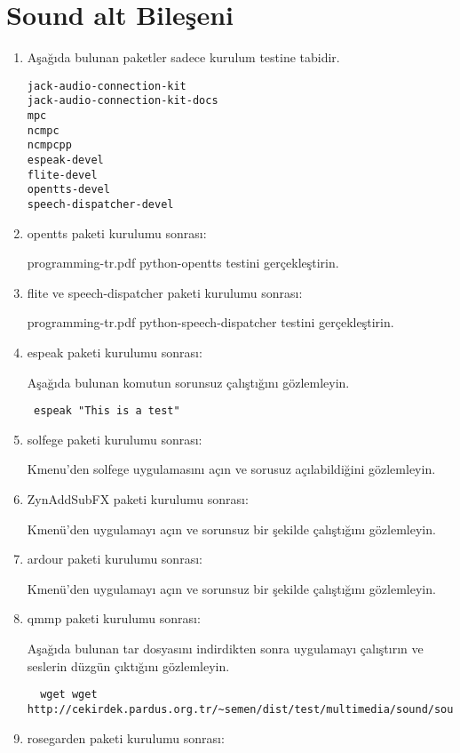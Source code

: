 \documentclass[a4paper,10pt]{article}
\begin{document}
\section{Sound alt Bileşeni}
\begin{enumerate}

\item Aşağıda bulunan paketler sadece kurulum testine tabidir.
\begin{verbatim}
jack-audio-connection-kit 
jack-audio-connection-kit-docs
mpc
ncmpc
ncmpcpp
espeak-devel
flite-devel
opentts-devel
speech-dispatcher-devel
\end{verbatim}
\item opentts paketi kurulumu sonrası:

programming-tr.pdf python-opentts testini gerçekleştirin.


\item flite ve speech-dispatcher paketi kurulumu sonrası:

programming-tr.pdf python-speech-dispatcher testini gerçekleştirin.

\item espeak paketi kurulumu sonrası:

Aşağıda bulunan komutun sorunsuz çalıştığını gözlemleyin.

\begin{verbatim}
 espeak "This is a test"
\end{verbatim}

\item solfege paketi kurulumu sonrası:

Kmenu'den solfege uygulamasını açın ve sorusuz açılabildiğini gözlemleyin.

\item ZynAddSubFX paketi kurulumu sonrası:

Kmenü'den uygulamayı açın ve sorunsuz bir şekilde çalıştığını gözlemleyin.

\item ardour paketi kurulumu sonrası:

Kmenü'den uygulamayı açın ve sorunsuz bir şekilde çalıştığını gözlemleyin.

\item qmmp paketi kurulumu sonrası:
 
Aşağıda bulunan tar dosyasını indirdikten sonra uygulamayı çalıştırın ve seslerin düzgün çıktığını gözlemleyin.
 \begin{verbatim}
  wget wget http://cekirdek.pardus.org.tr/~semen/dist/test/multimedia/sound/sound.tar
 \end{verbatim}	
\item rosegarden paketi kurulumu sonrası:


\end{enumerate}
\end{document}
